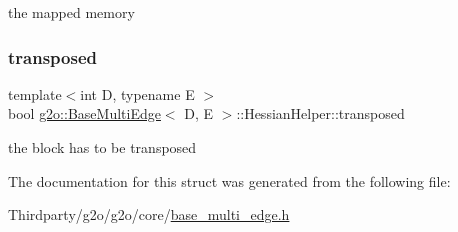 the mapped memory 

\mbox{\label{structg2o_1_1_base_multi_edge_1_1_hessian_helper_aeaff0227a982c30364d97ef9f0d9d60c}} 
\subsubsection{\texorpdfstring{transposed}{transposed}}
{\footnotesize\ttfamily template$<$int D, typename E $>$ \\
bool \mbox{\hyperlink{classg2o_1_1_base_multi_edge}{g2o\+::\+Base\+Multi\+Edge}}$<$ D, E $>$\+::Hessian\+Helper\+::transposed}



the block has to be transposed 



The documentation for this struct was generated from the following file\+:\begin{DoxyCompactItemize}
\item 
Thirdparty/g2o/g2o/core/\mbox{\hyperlink{base__multi__edge_8h}{base\+\_\+multi\+\_\+edge.\+h}}\end{DoxyCompactItemize}
